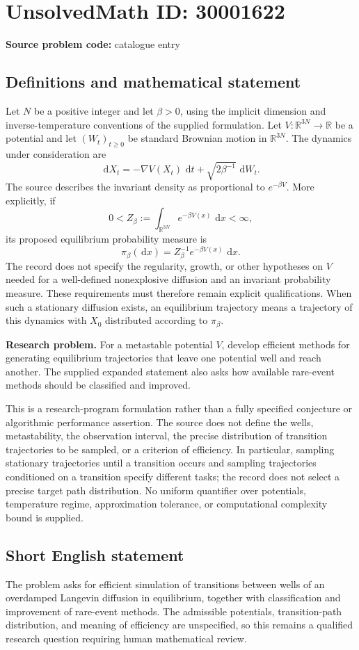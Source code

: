 \documentclass[11pt]{article}
\newcommand{\R}{\mathbb{R}}
\newcommand{\dd}{\,\mathrm{d}}
\begin{document}
\section*{UnsolvedMath ID: 30001622}
\textbf{Source problem code:} catalogue entry
\subsection{Definitions and mathematical statement}
Let \(N\) be a positive integer and let \(\beta>0\), using the implicit dimension and inverse-temperature conventions of the supplied formulation. Let \(V:\R^{3N}\to\R\) be a potential and let \((W_t)_{t\geq0}\) be standard Brownian motion in \(\R^{3N}\). The dynamics under consideration are
\[
\dd X_t=-\nabla V(X_t)\,\dd t+\sqrt{2\beta^{-1}}\,\dd W_t.
\]
The source describes the invariant density as proportional to \(e^{-\beta V}\). More explicitly, if
\[
0<Z_\beta:=\int_{\R^{3N}}e^{-\beta V(x)}\,\dd x<\infty,
\]
its proposed equilibrium probability measure is
\[
\pi_\beta(\dd x)=Z_\beta^{-1}e^{-\beta V(x)}\,\dd x.
\]
The record does not specify the regularity, growth, or other hypotheses on \(V\) needed for a well-defined nonexplosive diffusion and an invariant probability measure. These requirements must therefore remain explicit qualifications. When such a stationary diffusion exists, an equilibrium trajectory means a trajectory of this dynamics with \(X_0\) distributed according to \(\pi_\beta\).

\textbf{Research problem.} For a metastable potential \(V\), develop efficient methods for generating equilibrium trajectories that leave one potential well and reach another. The supplied expanded statement also asks how available rare-event methods should be classified and improved.

This is a research-program formulation rather than a fully specified conjecture or algorithmic performance assertion. The source does not define the wells, metastability, the observation interval, the precise distribution of transition trajectories to be sampled, or a criterion of efficiency. In particular, sampling stationary trajectories until a transition occurs and sampling trajectories conditioned on a transition specify different tasks; the record does not select a precise target path distribution. No uniform quantifier over potentials, temperature regime, approximation tolerance, or computational complexity bound is supplied.
\subsection{Short English statement}
The problem asks for efficient simulation of transitions between wells of an overdamped Langevin diffusion in equilibrium, together with classification and improvement of rare-event methods. The admissible potentials, transition-path distribution, and meaning of efficiency are unspecified, so this remains a qualified research question requiring human mathematical review.
\end{document}
